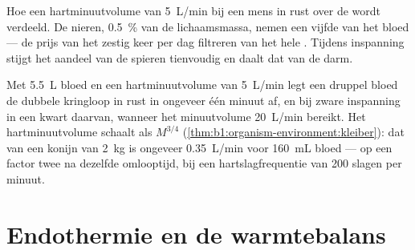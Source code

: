 \begin{omfigure}

{\small Hoe een hartminuutvolume van \qty{5}{L/min} bij een mens in rust over
de  wordt verdeeld. De nieren, \qty{0.5}{\%} van de lichaamsmassa,
nemen een vijfde van het bloed --- de prijs van het zestig keer per dag
filtreren van het hele . Tijdens inspanning stijgt het aandeel van de
spieren tienvoudig en daalt dat van de darm.}
\end{omfigure}

\begin{example}[De omlooptijd]\label{ex:b1:mammal-organization:circtime}
Met \qty{5.5}{L} bloed en een hartminuutvolume van \qty{5}{L/min} legt een
druppel bloed de dubbele kringloop in rust in ongeveer één minuut af, en bij
zware inspanning in een kwart daarvan, wanneer het minuutvolume
\qty{20}{L/min} bereikt. Het hartminuutvolume schaalt als $M^{3/4}$
(\cref{thm:b1:organism-environment:kleiber}): dat van een konijn van
\qty{2}{kg} is ongeveer \qty{0.35}{L/min} voor \qty{160}{mL} bloed --- op een
factor twee na dezelfde omlooptijd, bij een hartslagfrequentie van
\qty{200}{} slagen per minuut.
\end{example}

\section{Endothermie en de warmtebalans}

